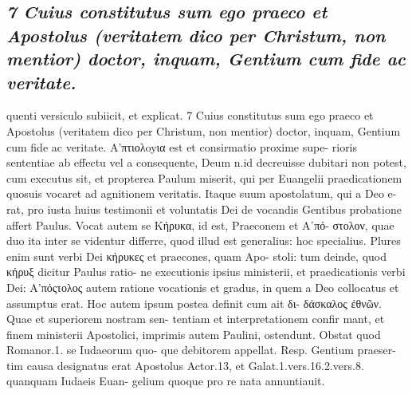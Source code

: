 \documentclass{article}
\begin{document}
\begin{pages}
\subsection*{\textit{7 Cuius constitutus sum ego praeco et Apostolus (veritatem dico per Christum, non mentior) doctor, inquam, Gentium cum fide ac veritate.}}quenti versiculo subiicit, et explicat. 7 Cuius constitutus sum ego praeco et Apostolus (veritatem dico per Christum, non mentior) doctor, inquam, Gentium  cum fide ac veritate. Α’πτιολoyια est et consirmatio proxime supe- rioris sententiae ab effectu vel a consequente, Deum n.id decreuisse dubitari non potest, cum executus sit, et propterea Paulum miserit, qui per Euangelii praedicationem quosuis vocaret ad agnitionem veritatis. Itaque suum apostolatum, qui a Deo e- rat, pro iusta huius testimonii et voluntatis Dei de vocandis Gentibus probatione affert Paulus. Vocat autem se Κήρυκα, id est, Praeconem et Aʹπό- στολον, quae duo ita inter se videntur differre, quod illud est generalius: hoc specialius. Plures enim sunt verbi Dei κήρυκες et praecones, quam Apo- stoli: tum deinde, quod κήρυξ dicitur Paulus ratio- ne executionis ipsius ministerii, et praedicationis verbi Dei: Α’πόςτολος autem ratione vocationis et gradus, in quem a Deo collocatus et assumptus erat. Hoc autem ipsum postea definit cum ait δι- δάσκαλος ἐθνῶν. Quae et superiorem nostram sen- tentiam et interpretationem confir mant, et finem ministerii Apostolici, imprimis autem Paulini, ostendunt. Obstat quod Romanor.1. se Iudaeorum quo- que debitorem appellat. Resp. Gentium praeser- tim causa designatus erat Apostolus Actor.13, et Galat.1.vers.16.2.vers.8. quanquam Iudaeis Euan- gelium quoque pro re nata annuntiauit.  \pend

\end{pages}
\end{document}
